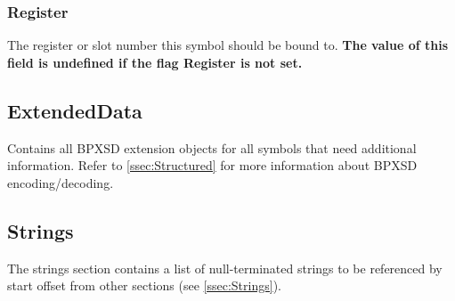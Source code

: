 \subsubsection{Register}
The register or slot number this symbol should be bound to.\newline
\textbf{The value of this field is undefined if the flag Register is not set.}

\subsection{ExtendedData}
Contains all BPXSD extension objects for all symbols that need additional information.\newline
Refer to \ref{ssec:Structured} for more information about BPXSD encoding/decoding.

\subsection{Strings}
The strings section contains a list of null-terminated strings to be referenced by start offset from other sections (see \ref{ssec:Strings}).